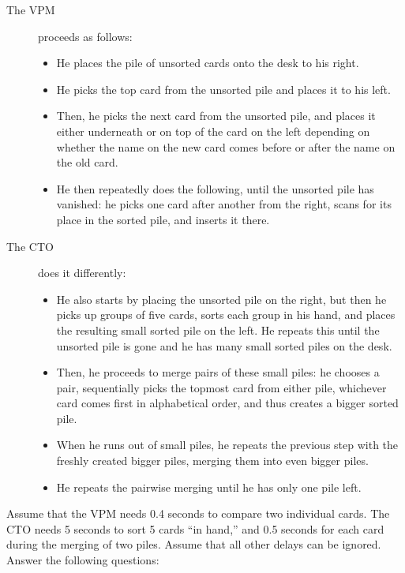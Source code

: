 \documentclass[a4paper]{article}
\newcounter{question}
\begin{document}
\begin{description}
\item[The VPM]
  proceeds as follows:
  \begin{itemize}
  \item
    He places the pile of unsorted cards onto the desk to his right.
  \item
    He picks the top card from the unsorted pile and places it to his left.
  \item
    Then, he picks the next card from the unsorted pile, and places it either underneath or on top of the card on the left depending on whether the name on the new card comes before or after the name on the old card.
  \item
    He then repeatedly does the following, until the unsorted pile has vanished:
    he picks one card after another from the right, scans for its place in the sorted pile, and inserts it there.
  \end{itemize}
\item[The CTO]
  does it differently:
  \begin{itemize}
  \item
    He also starts by placing the unsorted pile on the right, but then he picks up groups of five cards, sorts each group in his hand, and places the resulting small sorted pile on the left.
    He repeats this until the unsorted pile is gone and he has many small sorted piles on the desk.
  \item
    Then, he proceeds to merge pairs of these small piles:
    he chooses a pair, sequentially picks the topmost card from either pile, whichever card comes first in alphabetical order, and thus creates a bigger sorted pile.
  \item
    When he runs out of small piles, he repeats the previous step with the freshly created bigger piles, merging them into even bigger piles.
  \item
    He repeats the pairwise merging until he has only one pile left.
  \end{itemize}
\end{description}

Assume that the VPM needs 0.4 seconds to compare two individual cards.
The CTO needs 5 seconds to sort 5 cards ``in hand,'' and 0.5 seconds for each card during the merging of two piles.
Assume that all other delays can be ignored.
Answer the following questions:
\end{document}

